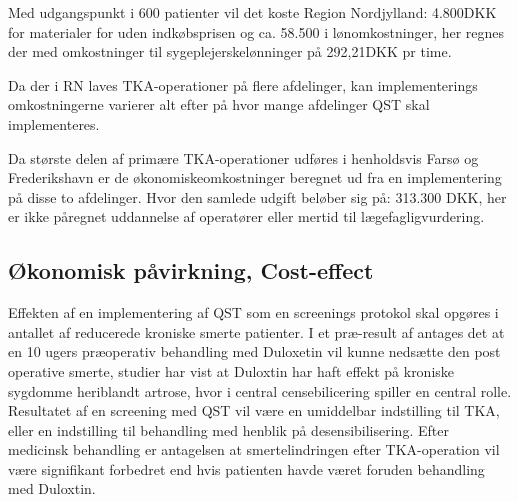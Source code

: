 Med udgangspunkt i 600 patienter vil det koste Region Nordjylland: 4.800DKK for materialer for uden indkøbsprisen og ca. 58.500 i lønomkostninger, her regnes der med omkostninger til sygeplejerskelønninger på 292,21DKK pr time.\citep{DST1}\citep{DST2}

Da der i RN laves TKA-operationer på flere afdelinger, kan implementerings omkostningerne varierer alt efter på hvor mange afdelinger QST skal implementeres. 

Da største delen af primære TKA-operationer udføres i henholdsvis Farsø og Frederikshavn er de økonomiskeomkostninger beregnet ud fra en implementering på disse to afdelinger. Hvor den samlede udgift beløber sig på: 313.300 DKK, her er ikke påregnet uddannelse af operatører eller mertid til lægefagligvurdering.


\subsection*{Økonomisk påvirkning, Cost-effect}

Effekten af en implementering af QST som en screenings protokol skal opgøres i antallet af reducerede kroniske smerte patienter. I et præ-result af  antages det at en 10 ugers præoperativ behandling med Duloxetin vil kunne nedsætte den post operative smerte, studier har vist at Duloxtin har haft effekt på kroniske sygdomme heriblandt artrose, hvor i central censebilicering spiller en central rolle. \citep{Blikman2016} Resultatet af en screening med QST vil være en umiddelbar indstilling til TKA, eller en indstilling til behandling med henblik på desensibilisering. Efter medicinsk behandling er antagelsen at smertelindringen efter TKA-operation vil være signifikant forbedret end hvis patienten havde været foruden behandling med Duloxtin. 




